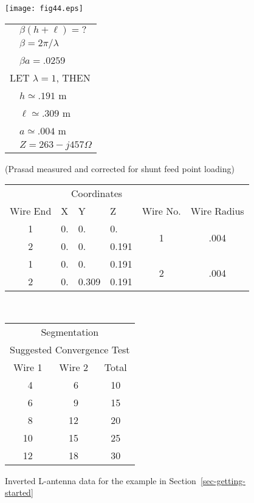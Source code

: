 \documentclass[12pt]{article}
\begin{document}
\begin{figure}[htb]
\begin{center}
\texttt{[image: fig44.eps]}
\ \\
\begin{tabular}{ll}
 & $\beta(h+\ell) = ?$     \\
 & $\beta = 2\pi/\lambda$  \\
 & $\beta a = .025$9       \\
\multicolumn{2}{l}{LET $\lambda = 1$, THEN} \\
 & $h   \simeq .191$ m    \\
 & $\ell\simeq .309$ m    \\
 & $a   \simeq .004$ m    \\
 & $Z = 263 - j457\Omega$ \\
\end{tabular}

(Prasad \cite{r18} measured and
corrected for shunt feed
point loading)
\ \\[5mm]
\begin{tabular}{c|l|l|l|c|c}
& \multicolumn{3}{c|}{Coordinates} & & \\
\cline{2-4}
Wire End & X  & Y      & Z     & Wire No. & Wire Radius \\
\hline
1        & 0. & 0.     & 0.    & \multirow{2}{*}{1} & \multirow{2}{*}{.004} \\
\cline{1-4}
2        & 0. & 0.     & 0.191 &                    & \\
\hline
1        & 0. & 0.     & 0.191 & \multirow{2}{*}{2} & \multirow{2}{*}{.004} \\
\cline{1-4}
2        & 0. & 0.309  & 0.191 &                    & \\
\end{tabular}
\ \\[5mm]
\begin{tabular}{c|c|c}
\multicolumn{3}{c}{Segmentation}                \\
\multicolumn{3}{c}{Suggested Convergence Test}  \\
Wire 1 & Wire 2 & Total \\
\hline
\ 4 & \ 6 & 10 \\
\ 6 & \ 9 & 15 \\
\ 8 & 12  & 20 \\
10  & 15  & 25 \\
12  & 18  & 30 \\
\end{tabular}
\end{center}
\caption{Inverted L-antenna data for the example in
Section~\ref{sec-getting-started}}
\label{fig44}
\end{figure}
\afterpage\clearpage
\end{document}
